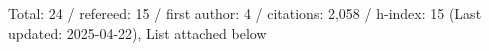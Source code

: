 Total: 24 / refereed: 15 / first author: 4 / citations: 2,058 / h-index: 15 (Last updated: 2025-04-22), List attached below